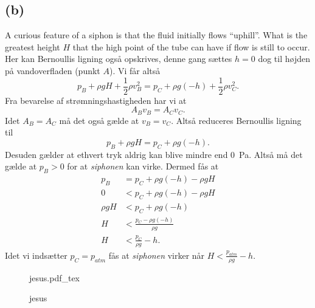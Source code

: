 \documentclass[12pt]{article}
\newcommand{\incfig}[2][1]{%
  \def\svgwidth{#1\columnwidth}
  {#2.pdf_tex}
}
\theoremstyle{definition}
\begin{document}
\subsection*{(b)}
A curious feature of a siphon is that the fluid initially flows ``uphill''. What is the greatest height $H$ that the high point of the tube can have if flow is still to occur.
\bigbreak
Her kan Bernoullis ligning også opskrives, denne gang sættes $h = 0$ dog til højden på vandoverfladen (punkt $A$). Vi får altså
\[ 
p_B + \rho gH + \frac{1}{2}\rho v_B^2 = p_C + \rho g (-h) + \frac{1}{2} \rho v_C^2
.\]
Fra bevarelse af strømningshastigheden har vi at
\[ 
A_B v_B = A_C v_C
.\]
Idet $A_B = A_C$ må det også gælde at $v_B = v_C$. Altså reduceres Bernoullis ligning til
\[ 
p_B + \rho gH = p_C + \rho g(-h)
.\]
Desuden gælder at ethvert tryk aldrig kan blive mindre end \qty{0}{Pa}. Altså må det gælde at $p_B > 0$ for at \textit{siphonen} kan virke. Dermed fås at
\begin{align*}
  p_B &= p_C + \rho g(-h) - \rho g H \\
  0 &< p_C + \rho g (-h) - \rho g H \\
  \rho g H &< p_C + \rho g (-h) \\
  H &< \frac{p_C - \rho g (-h)}{\rho g} \\
  H &< \frac{p_C}{\rho g} - h
.\end{align*}
Idet vi indsætter $p_C = p_{atm}$ fås at \textit{siphonen} virker når \underline{\underline{$ H < \frac{p_{atm}}{\rho g} - h$}}.

\begin{figure}[ht]
    \centering
    \incfig{jesus}
    \caption{jesus}
    \label{fig:jesus}
\end{figure}
\end{document}
